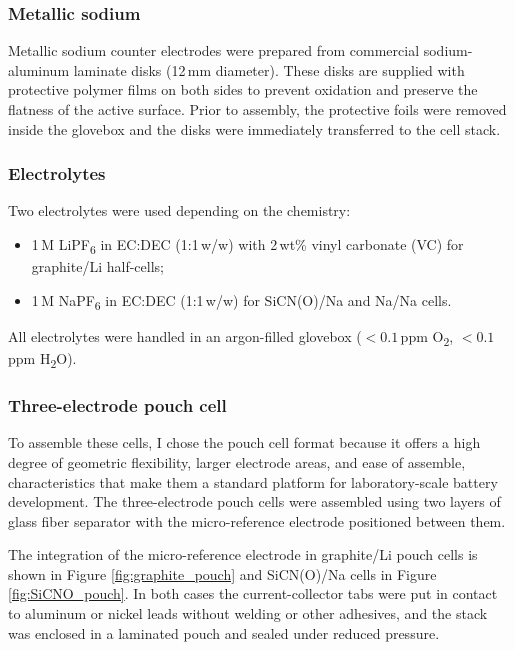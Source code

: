 \subsubsection{Metallic sodium}
Metallic sodium counter electrodes were prepared from commercial sodium-aluminum laminate disks (12\,mm diameter).  
These disks are supplied with protective polymer films on both sides to prevent oxidation and preserve the flatness of the active surface.  
Prior to assembly, the protective foils were removed inside the glovebox and the disks were immediately transferred to the cell stack.

\subsubsection{Electrolytes}
Two electrolytes were used depending on the chemistry:
\begin{itemize}
    \item 1\,M LiPF\textsubscript{6} in EC:DEC (1:1\,w/w) with 2\,wt\% vinyl carbonate (VC) for graphite/Li half-cells;
    \item 1\,M NaPF\textsubscript{6} in EC:DEC (1:1\,w/w) for SiCN(O)/Na and Na/Na cells.
\end{itemize}
All electrolytes were handled in an argon-filled glovebox ($< 0.1$\,ppm O\textsubscript{2}, $< 0.1$\,ppm H\textsubscript{2}O).

\subsubsection{Three-electrode pouch cell}

To assemble these cells, I chose the pouch cell format because it offers a high degree of geometric flexibility, larger electrode areas, and ease of assemble, characteristics that make them a standard platform for laboratory-scale battery development.  
The three-electrode pouch cells were assembled using two layers of glass fiber separator with the micro-reference electrode positioned between them.  

The integration of the micro-reference electrode in graphite/Li pouch cells is shown in Figure \ref{fig:graphite_pouch} and SiCN(O)/Na cells in Figure \ref{fig:SiCNO_pouch}.  
In both cases the current-collector tabs were put in contact to aluminum or nickel leads without welding or other adhesives, and the stack was enclosed in a laminated pouch and sealed under reduced pressure. 

